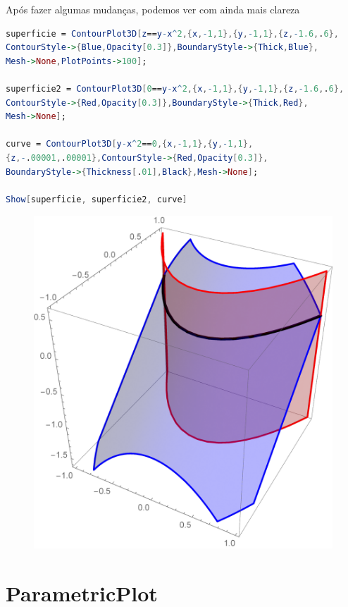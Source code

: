 \documentclass[a4paper, 12pt]{article}
\begin{document}
Após fazer algumas mudanças, podemos ver com ainda mais clareza

\begin{lstlisting}[language=Mathematica]
superficie = ContourPlot3D[z==y-x^2,{x,-1,1},{y,-1,1},{z,-1.6,.6}, 
ContourStyle->{Blue,Opacity[0.3]},BoundaryStyle->{Thick,Blue},
Mesh->None,PlotPoints->100];

superficie2 = ContourPlot3D[0==y-x^2,{x,-1,1},{y,-1,1},{z,-1.6,.6}, 
ContourStyle->{Red,Opacity[0.3]},BoundaryStyle->{Thick,Red},
Mesh->None];

curve = ContourPlot3D[y-x^2==0,{x,-1,1},{y,-1,1},
{z,-.00001,.00001},ContourStyle->{Red,Opacity[0.3]},
BoundaryStyle->{Thickness[.01],Black},Mesh->None];

Show[superficie, superficie2, curve]
\end{lstlisting}
\begin{figure}[!h]
	\centering
	\includegraphics[scale=.5]{images/Together}
\end{figure}

\section{ParametricPlot}
\end{document}
